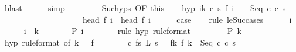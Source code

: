 \begin{isabellebody}
\ blast\isanewline
\ \ \ \ \isamarkupfalse%
\ simp\isanewline
\ \ \ \ \isamarkupfalse%
\isanewline
\isanewline
\ \ \isamarkupfalse%
\ Suc{\isachardot}hyps\ {\isacharbrackleft}OF\ this{\isacharbrackright}\isanewline
\ \ \isamarkupfalse%
\ hyp{\isacharcolon}\ {\isachardoublequoteopen}{\isasymforall}i{\isacharless}k{\isachardot}\ {\isacharparenleft}{\isasymexists}c{\isacharprime}\ s{\isacharprime}{\isachardot}\ f\ {\isacharparenleft}i\ {\isacharplus}\ {}{\isacharparenright}\ {\isacharequal}\ {\isacharparenleft}Seq\ c{\isacharprime}\ c\ s{\isacharprime}{\isacharparenright}{\isacharparenright}\ {\isasymand}\ \isanewline
\ \ \ \ \ \ \ \ \ \ \ \ \ \ \ \ \ \ \ {\isasymGamma}{\isasymturnstile}\ head\ {\isacharparenleft}f\ i{\isacharparenright}\ {\isasymrightarrow}\ head\ {\isacharparenleft}f\ {\isacharparenleft}i\ {\isacharplus}\ {}{\isacharparenright}{\isacharparenright}{\isachardoublequoteclose}\isacommand{{\isachardot}}\isamarkupfalse%
\isanewline
\ \ \isamarkupfalse%
\ {\isacharquery}case\isanewline
\ \ \isamarkupfalse%
\ {\isacharparenleft}rule\ le{\isacharunderscore}Suc{\isacharunderscore}cases{\isacharparenright}\isanewline
\ \ \ \ \isamarkupfalse%
\ i\ \isanewline
\ \ \ \ \isamarkupfalse%
\ {\isachardoublequoteopen}i\ {\isacharless}\ k{\isachardoublequoteclose}\isanewline
\ \ \ \ \isamarkupfalse%
\ \isamarkupfalse%
\ {\isachardoublequoteopen}{\isacharquery}P\ i{\isachardoublequoteclose}\isanewline
\ \ \ \ \ \ \isamarkupfalse%
\ {\isacharparenleft}rule\ hyp\ {\isacharbrackleft}rule{\isacharunderscore}format{\isacharbrackright}{\isacharparenright}\isanewline
\ \ \isamarkupfalse%
\isanewline
\ \ \ \ \isamarkupfalse%
\ {\isachardoublequoteopen}{\isacharquery}P\ k{\isachardoublequoteclose}\isanewline
\ \ \ \ \isamarkupfalse%
\ {\isacharminus}\isanewline
\ \ \ \ \ \ \isamarkupfalse%
\ hyp\ {\isacharbrackleft}rule{\isacharunderscore}format{\isacharcomma}\ of\ {\isachardoublequoteopen}k\ {\isacharminus}\ {}{\isachardoublequoteclose}{\isacharbrackright}\ f{\isacharunderscore}{}\isanewline
\ \ \ \ \ \ \isamarkupfalse%
\ c{\isacharprime}\ fs{\isacharprime}\ L{\isacharprime}\ s{\isacharprime}\ \ \ f{\isacharunderscore}k{\isacharcolon}\ {\isachardoublequoteopen}f\ k\ {\isacharequal}\ {\isacharparenleft}Seq\ c{\isacharprime}\ c\ s{\isacharprime}{\isacharparenright}{\isachardoublequoteclose}\isanewline

\end{isabellebody}
